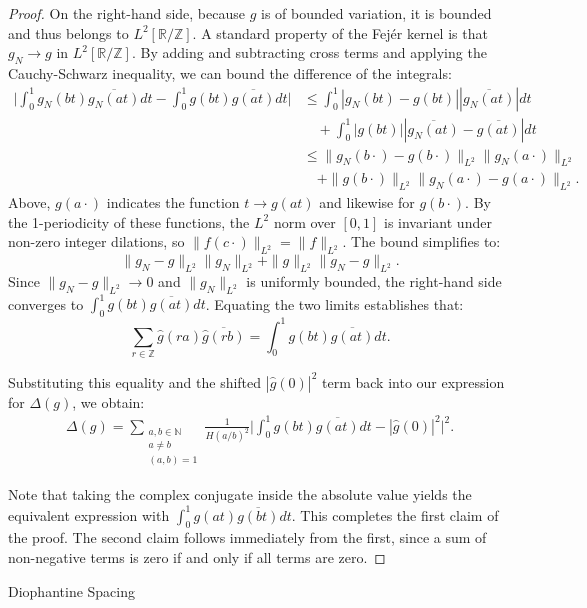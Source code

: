\documentclass[12pt]{amsart}
\makeatletter
\renewcommand\subsection{\@startsection{subsection}{2}%
	\z@{1\linespacing\@plus1\linespacing}{\linespacing}%
	{\normalfont\bfseries\centering}}
\renewcommand{\le}{\leqslant}
\numberwithin{equation}{section}
\theoremstyle{plain}
\theoremstyle{definition}
\newcommand{\N}{\mathbb{N}}
\newcommand{\Z}{\mathbb{Z}}
\newcommand{\R}{\mathbb{R}}
\makeatother
\begin{document}
\begin{proof}
	On the right-hand side, because $g$ is of bounded variation, it is bounded and thus belongs to $L^2[\R/\Z]$. A standard property of the Fej\'er kernel is that $g_N \to g$ in $L^2[\R/\Z]$. By adding and subtracting cross terms and applying the Cauchy-Schwarz inequality, we can bound the difference of the integrals:
	\begin{align*}
		\bigg| \int_0^1 g_N(bt)\overline{g_N(at)}dt - \int_0^1 g(bt)\overline{g(at)}dt \bigg| &\le \int_0^1 |g_N(bt) - g(bt)||\overline{g_N(at)}| dt \\
		& \quad + \int_0^1 |g(bt)||\overline{g_N(at)} - \overline{g(at)}| dt \\
		&\le \|g_N(b \cdot) - g(b \cdot)\|_{L^2} \|g_N(a \cdot)\|_{L^2}\\ & \quad + \|g(b \cdot)\|_{L^2} \|g_N(a \cdot) - g(a \cdot)\|_{L^2}.
	\end{align*}
	Above, $g(a \cdot)$ indicates the function $t \to g(at)$ and likewise for $g(b \cdot)$. By the 1-periodicity of these functions, the $L^2$ norm over $[0,1]$ is invariant under non-zero integer dilations, so $\|f(c \cdot)\|_{L^2} = \|f\|_{L^2}$. The bound simplifies to:
	$$\|g_N - g\|_{L^2} \|g_N\|_{L^2} + \|g\|_{L^2} \|g_N - g\|_{L^2}.$$
	Since $\|g_N - g\|_{L^2} \to 0$ and $\|g_N\|_{L^2}$ is uniformly bounded, the right-hand side converges to $\int_0^1 g(bt)\overline{g(at)}dt$. Equating the two limits establishes that:
	$$\sum_{r \in \Z} \hat{g}(ra) \overline{\hat{g}(rb)} = \int_0^1 g(bt)\overline{g(at)}dt.$$
	
	Substituting this equality and the shifted $|\hat{g}(0)|^2$ term back into our expression for $\Delta(g)$, we obtain:
	\begin{align*}
		\Delta(g) = \sum_{\substack{a,b \in \N \\ a \ne b \\ (a,b) = 1}}\frac{1}{H(a/b)^2} \bigg|\int_0^1 g(bt)\overline{g(at)}dt - |\hat{g}(0)|^2\bigg|^2.
	\end{align*}
	
	Note that taking the complex conjugate inside the absolute value yields the equivalent expression with $\int_0^1 g(at)\overline{g(bt)}dt$. This completes the first claim of the proof. The second claim follows immediately from the first, since a sum of non-negative terms is zero if and only if all terms are zero.
\end{proof}
	
	\subsection{Diophantine Spacing}
	
\end{document}
